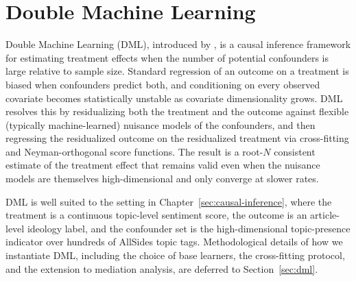 \section{Double Machine Learning}
\label{sec:dml-related-work}

Double Machine Learning (DML), introduced by \citet{chernozhukov2018}, is a causal inference framework for estimating treatment effects when the number of potential confounders is large relative to sample size. Standard regression of an outcome on a treatment is biased when confounders predict both, and conditioning on every observed covariate becomes statistically unstable as covariate dimensionality grows. DML resolves this by residualizing both the treatment and the outcome against flexible (typically machine-learned) nuisance models of the confounders, and then regressing the residualized outcome on the residualized treatment via cross-fitting and Neyman-orthogonal score functions. The result is a root-$N$ consistent estimate of the treatment effect that remains valid even when the nuisance models are themselves high-dimensional and only converge at slower rates.

DML is well suited to the setting in Chapter~\ref{sec:causal-inference}, where the treatment is a continuous topic-level sentiment score, the outcome is an article-level ideology label, and the confounder set is the high-dimensional topic-presence indicator over hundreds of AllSides topic tags. Methodological details of how we instantiate DML, including the choice of base learners, the cross-fitting protocol, and the extension to mediation analysis, are deferred to Section~\ref{sec:dml}.
